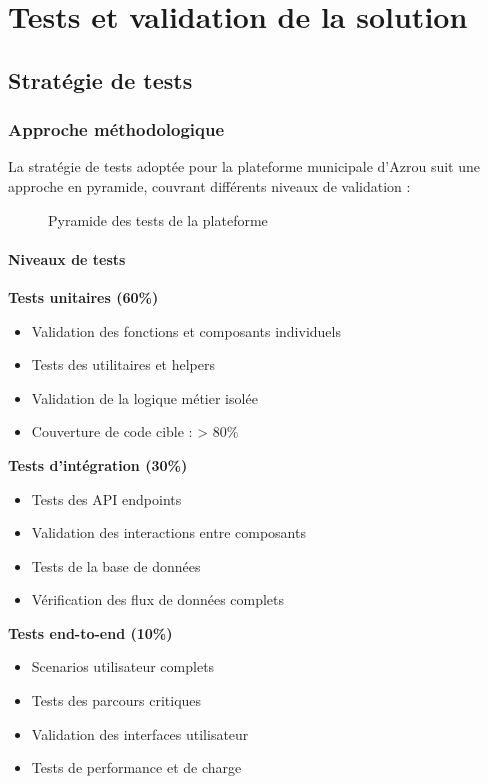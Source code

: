 \chapter{Tests et validation de la solution}

\section{Stratégie de tests}

\subsection{Approche méthodologique}

La stratégie de tests adoptée pour la plateforme municipale d'Azrou suit une approche en pyramide, couvrant différents niveaux de validation :

\begin{figure}[H]
\centering
\caption{Pyramide des tests de la plateforme}
\label{fig:pyramide-tests}
\end{figure}

\subsubsection{Niveaux de tests}

\textbf{Tests unitaires (60\%)}
\begin{itemize}
\item Validation des fonctions et composants individuels
\item Tests des utilitaires et helpers
\item Validation de la logique métier isolée
\item Couverture de code cible : > 80\%
\end{itemize}

\textbf{Tests d'intégration (30\%)}
\begin{itemize}
\item Tests des API endpoints
\item Validation des interactions entre composants
\item Tests de la base de données
\item Vérification des flux de données complets
\end{itemize}

\textbf{Tests end-to-end (10\%)}
\begin{itemize}
\item Scenarios utilisateur complets
\item Tests des parcours critiques
\item Validation des interfaces utilisateur
\item Tests de performance et de charge
\end{itemize}

